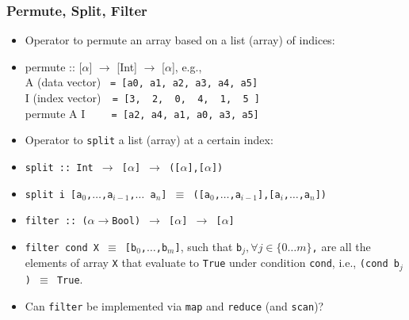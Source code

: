\documentclass{beamer}
\renewcommand{\emph}[1]{\textcolor{structure}{#1}}
\newcommand{\emp}[1]{\textcolor{DikuRed}{ #1}}
\begin{document}
\begin{frame}[fragile,t]
  \frametitle{Permute, Split, Filter}

\begin{itemize}
    \item Operator to permute an array based on a list (array) of indices:
    \item \emph{permute :: [$\alpha$] $\rightarrow$ [Int] $\rightarrow$ [$\alpha$]}, e.g.,\\
           A (data vector) {\tt~= [a0,~a1,~a2,~a3,~a4,~a5]}\\
           I (index vector){\tt~~= [3,~~2,~~0,~~4,~~1,~~5~]}\\
           permute A I     {\tt~~~~= [a2,~a4,~a1,~a0,~a3,~a5]}\medskip

    \item Operator to {\tt split} a list (array) at a certain index:
    \item \emph{\tt split :: Int $\rightarrow$ [$\alpha$] $\rightarrow$ ([$\alpha$],[$\alpha$])}
    \item \emp{\tt split i [a$_0$,$\ldots$,a$_{i-1}$,$\ldots$ a$_n$] $\equiv$ ([a$_0$,$\ldots$,a$_{i-1}$],[a$_i$,$\ldots$,a$_{n}$])}\medskip
 
    \item \emph{\tt filter :: ($\alpha\rightarrow$Bool) $\rightarrow$ [$\alpha$] $\rightarrow$ [$\alpha$]}
    \item \emp{\tt filter cond X $\equiv$ [b$_0$,$\ldots$,b$_{m}$]}, such that 
                {\tt b$_j, \forall j\in\{0\ldots m\}$,} are all the elements of array 
                {\tt X} that evaluate to {\tt True} under condition {\tt cond}, i.e., {\tt (cond b$_j$) $\equiv$ True}.\medskip

    \item \alert{Can {\tt filter} be implemented via {\tt map} and {\tt reduce} (and {\tt scan})?}

\end  {itemize}

\end{frame}
\end{document}
